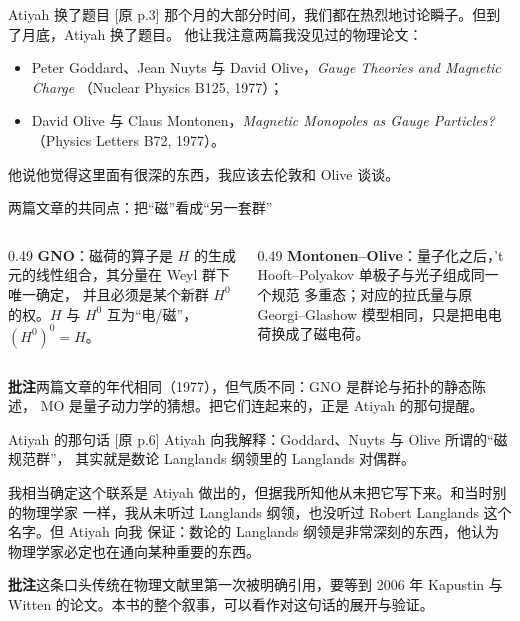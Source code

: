 \documentclass[aspectratio=169,12pt]{ctexbeamer}
\newcommand{\srcp}[1]{{\color{black!40}\scriptsize[原 p.#1]}}
\begin{document}
\begin{frame}{Atiyah 换了题目}
  \srcp{3} 那个月的大部分时间，我们都在热烈地讨论瞬子。但到了月底，Atiyah 换了题目。
  他让我注意两篇我没见过的物理论文：
  \begin{itemize}
    \item Peter Goddard、Jean Nuyts 与 David Olive，\emph{Gauge Theories and Magnetic Charge}
      （Nuclear Physics B125, 1977）；
    \item David Olive 与 Claus Montonen，\emph{Magnetic Monopoles as Gauge Particles?}
      （Physics Letters B72, 1977）。
  \end{itemize}
  他说他觉得这里面有很深的东西，我应该去伦敦和 Olive 谈谈。
\end{frame}

\begin{frame}{两篇文章的共同点：把“磁”看成“另一套群”}
  \begin{columns}[T]
  \begin{column}{0.49\textwidth}
    \textbf{GNO}：磁荷的算子是 $H$ 的生成元的线性组合，其分量在 Weyl 群下唯一确定，
    并且必须是某个新群 $H^0$ 的权。$H$ 与 $H^0$ 互为“电/磁”，$(H^0)^0=H$。
  \end{column}
  \begin{column}{0.49\textwidth}
    \textbf{Montonen--Olive}：量子化之后，'t Hooft--Polyakov 单极子与光子组成同一个规范
    多重态；对应的拉氏量与原 Georgi--Glashow 模型相同，只是把电电荷换成了磁电荷。
  \end{column}
  \end{columns}
  \vspace{0.5em}
  \begin{beizhu}
  \textbf{批注}\quad 两篇文章的年代相同（1977），但气质不同：GNO 是群论与拓扑的静态陈述，
  MO 是量子动力学的猜想。把它们连起来的，正是 Atiyah 的那句提醒。
  \end{beizhu}
\end{frame}

\begin{frame}{Atiyah 的那句话}
  \srcp{6} Atiyah 向我解释：Goddard、Nuyts 与 Olive 所谓的“磁规范群”，
  其实就是数论 Langlands 纲领里的 Langlands 对偶群。
  \vspace{0.4em}

  我相当确定这个联系是 Atiyah 做出的，但据我所知他从未把它写下来。和当时别的物理学家
  一样，我从未听过 Langlands 纲领，也没听过 Robert Langlands 这个名字。但 Atiyah 向我
  保证：数论的 Langlands 纲领是非常深刻的东西，他认为物理学家必定也在通向某种重要的东西。
  \begin{beizhu}
  \textbf{批注}\quad 这条口头传统在物理文献里第一次被明确引用，要等到 2006 年
  Kapustin 与 Witten 的论文。本书的整个叙事，可以看作对这句话的展开与验证。
  \end{beizhu}
\end{frame}
\end{document}
